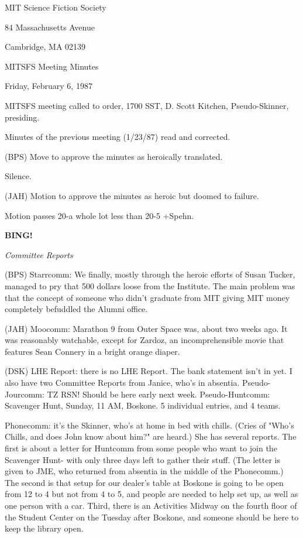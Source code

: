 \documentclass[12pt]{article}
\newcommand{\bing}{{\bf BING!} }
\newcommand{\goto}[1]{\bing \vskip 12pt \centerline{{\em{#1}}}}
\begin{document}
\begin{center}

MIT Science Fiction Society 

84 Massachusetts Avenue

Cambridge, MA 02139

\vspace{12pt}

MITSFS Meeting Minutes 

Friday, February 6, 1987

\end{center}
 
\vspace{18pt}

\setlength{\parskip}{6pt}

\noindent
MITSFS meeting called to order, 1700 SST,
D. Scott Kitchen, Pseudo-Skinner, presiding.

Minutes of the previous meeting (1/23/87) read and corrected.

(BPS) Move to approve the minutes as heroically translated.

Silence.

(JAH) Motion to approve the minutes as heroic but doomed to failure.

Motion passes 20-a whole lot less than 20-5 +Spehn.

\goto{Committee Reports}

(BPS) Starrcomm: We finally, mostly through the heroic efforts of Susan Tucker, managed to pry that 500 dollars loose from the Institute. The main problem was that the concept of someone who didn't graduate from MIT giving MIT money completely befuddled the Alumni office.

(JAH) Moocomm: Marathon 9 from Outer Space was, about two weeks ago. It was reasonably watchable, except for Zardoz, an incomprehensible movie that features Sean Connery in a bright orange diaper.

(DSK) LHE Report: there is no LHE Report. The bank statement isn't in yet. I also have two Committee Reports from Janice, who's in absentia. Pseudo-Jourcomm: TZ RSN! Should be here early next week. Pseudo-Huntcomm: Scavenger Hunt, Sunday, 11 AM, Boskone. 5 individual entries, and 4 teams.

Phonecomm: it's the Skinner, who's at home in bed with chills. (Cries of "Who's Chills, and does John know about him?" are heard.) She has several reports. The first is about a letter for Huntcomm from some people who want to join the Scavenger Hunt- with only three days left to gather their stuff. (The letter is given to JME, who returned from absentia in the middle of the Phonecomm.) The second is that setup for our dealer's table at Boskone is going to be open from 12 to 4 but not from 4 to 5, and people are needed to help set up, as well as one person with a car. Third, there is an Activities Midway on the fourth floor of the Student Center on the Tuesday after Boskone, and someone should be here to keep the library open.
\end{document}
